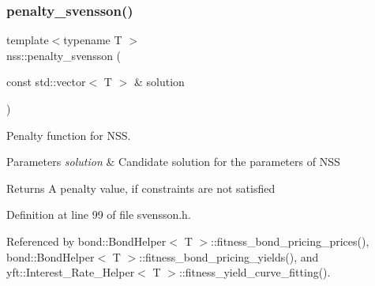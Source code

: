 \subsubsection{\texorpdfstring{penalty\+\_\+svensson()}{penalty\_svensson()}}
{\footnotesize\ttfamily template$<$typename T $>$ \\
nss\+::penalty\+\_\+svensson (\begin{DoxyParamCaption}\item[{const std\+::vector$<$ T $>$ \&}]{solution }\end{DoxyParamCaption})}



Penalty function for N\+SS. 


\begin{DoxyParams}{Parameters}
{\em solution} & Candidate solution for the parameters of N\+SS \\
\hline
\end{DoxyParams}
\begin{DoxyReturn}{Returns}
A penalty value, if constraints are not satisfied 
\end{DoxyReturn}


Definition at line 99 of file svensson.\+h.



Referenced by bond\+::\+Bond\+Helper$<$ T $>$\+::fitness\+\_\+bond\+\_\+pricing\+\_\+prices(), bond\+::\+Bond\+Helper$<$ T $>$\+::fitness\+\_\+bond\+\_\+pricing\+\_\+yields(), and yft\+::\+Interest\+\_\+\+Rate\+\_\+\+Helper$<$ T $>$\+::fitness\+\_\+yield\+\_\+curve\+\_\+fitting().



